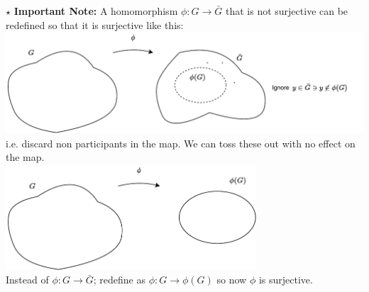 \begin{tcolorbox}
    $\star$ \textbf{Important Note:} A homomorphism $\phi: G\rightarrow \bar{G}$ that is not surjective can be redefined so that it is surjective like this:\\
    \includegraphics[width=\textwidth]{Figures/make_surj1.pdf}\\
    i.e. discard non participants in the map. We can toss these out with no effect on the map.\\
    \includegraphics[width=0.7\textwidth]{Figures/make_surj3.pdf}\\
    Instead of $\phi:G\rightarrow \bar{G}$; redefine as $\phi: G\rightarrow \phi(G)$ so now $\phi$ is surjective.
\end{tcolorbox}


